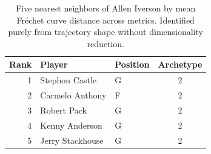 \begin{table}[htbp]
  \centering\small
  \begin{tabular}{rllc}
    \toprule
    Rank & Player & Position & Archetype \\
    \midrule
    1 & Stephon Castle & G & 2 \\
    2 & Carmelo Anthony & F & 2 \\
    3 & Robert Pack & G & 2 \\
    4 & Kenny Anderson & G & 2 \\
    5 & Jerry Stackhouse & G & 2 \\
    \bottomrule
  \end{tabular}
  \caption{Five nearest neighbors of Allen Iverson by mean Fr\'{e}chet curve distance across metrics. Identified purely from trajectory shape without dimensionality reduction.}
  \label{tab:Allen_Iverson_frechet_curve_neighbors}
\end{table}

